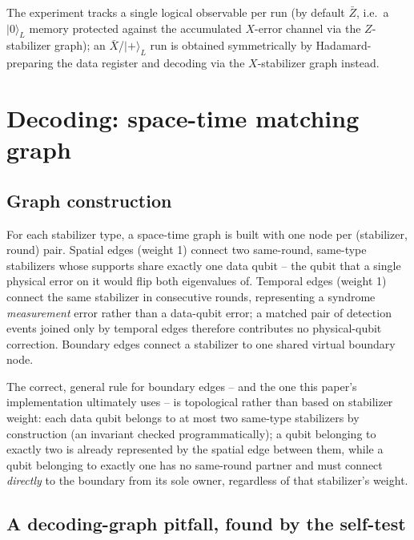 \documentclass[pdflatex,sn-mathphys,Numbered]{sn-jnl}
\begin{document}
The experiment tracks a single logical observable per run (by default $\bar Z$, i.e.\ a $\lvert 0\rangle_L$ memory protected against the accumulated $X$-error channel via the $Z$-stabilizer graph); an $\bar X$/$\lvert +\rangle_L$ run is obtained symmetrically by Hadamard-preparing the data register and decoding via the $X$-stabilizer graph instead.

\section{Decoding: space-time matching graph}\label{sec:decoder}

\subsection{Graph construction}

For each stabilizer type, a space-time graph is built with one node per (stabilizer, round) pair. Spatial edges (weight 1) connect two same-round, same-type stabilizers whose supports share exactly one data qubit -- the qubit that a single physical error on it would flip both eigenvalues of. Temporal edges (weight 1) connect the same stabilizer in consecutive rounds, representing a syndrome \emph{measurement} error rather than a data-qubit error; a matched pair of detection events joined only by temporal edges therefore contributes no physical-qubit correction. Boundary edges connect a stabilizer to one shared virtual boundary node.

The correct, general rule for boundary edges -- and the one this paper's implementation ultimately uses -- is topological rather than based on stabilizer weight: each data qubit belongs to at most two same-type stabilizers by construction (an invariant checked programmatically); a qubit belonging to exactly two is already represented by the spatial edge between them, while a qubit belonging to exactly one has no same-round partner and must connect \emph{directly} to the boundary from its sole owner, regardless of that stabilizer's weight.

\subsection{A decoding-graph pitfall, found by the self-test}
\end{document}
